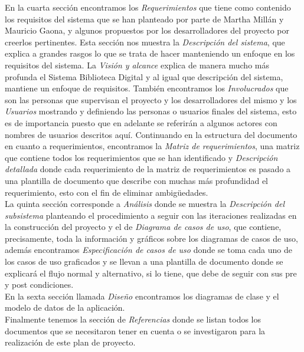 En la cuarta sección encontramos los  \textit{Requerimientos} que tiene como contenido los
requisitos del sistema que se han planteado por parte de Martha Millán y Mauricio Gaona, y algunos
propuestos por los desarrolladores del proyecto por creerlos pertinentes. Esta sección nos muestra
la \textit{Descripción del sistema}, que explica a grandes rasgos lo que se trata de hacer
manteniendo un enfoque en los requisitos del sistema. La  \textit{Visión y alcance} explica de
manera mucho más profunda el Sistema Biblioteca Digital y al igual que descripción del sistema,
mantiene un enfoque de requisitos. También encontramos los \textit{Involucrados} que son las
personas que supervisan el proyecto y los desarrolladores del mismo y los \textit{Usuarios}
mostrando y definiendo las personas o usuarios finales del sistema, esto es de importancia puesto
que en adelante se referirán a algunos actores con nombres de usuarios descritos aquí. Continuando
en la estructura del documento en cuanto a requerimientos, encontramos la \textit{Matriz de
requerimientos}, una matriz que contiene todos los requerimientos que se han identificado y
\textit{Descripción detallada} donde cada requerimiento de la matriz de requerimientos es pasado a
una plantilla de documento que describe con muchas más profundidad el requerimiento, esto con el
fin de eliminar ambigüedades.\\

La quinta sección corresponde a \textit{Análisis} donde se muestra la \textit{Descripción del
subsistema} planteando el procedimiento a seguir con las iteraciones realizadas en la construcción
del proyecto y el de \textit{Diagrama de casos de uso}, que contiene, precisamente, toda la
información y gráficos sobre los diagramas de casos de uso, además encontramos
\textit{Especificación de casos de uso} donde se toma cada uno de los casos de uso graficados y se
llevan a una plantilla de documento donde se explicará el flujo normal y alternativo, si lo tiene,
que debe de seguir con sus pre y post condiciones.\\

En la sexta sección llamada \textit{Diseño} encontramos los diagramas de clase y el modelo de datos de la aplicación.\\

Finalmente tenemos la sección de \textit{Referencias} donde se listan todos los documentos que se
necesitaron tener en cuenta o se investigaron para la realización de este plan de proyecto.\\

%